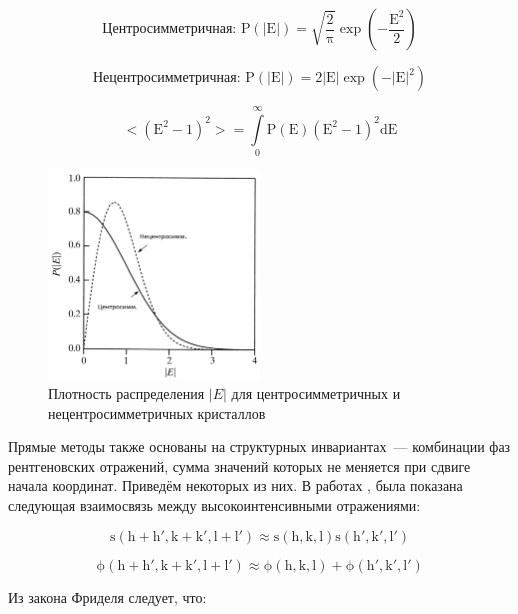 \begin{equation}\label{pe1}
	\mathrm{\text{Центросимметричная: }P(|E|)=\sqrt{\frac{2}{\pi}}\exp(-\frac{E^2}{2})}
\end{equation}

\begin{equation}\label{pe2}
	\mathrm{\text{Нецентросимметричная: }P(|E|) = 2|E|\exp(-|E|^2)}
\end{equation}

\begin{equation}\label{mean}
	\mathrm{<(E^2-1)^2> = \int\limits_0^\infty P(E)(E^2-1)^2dE}
\end{equation}

\begin{figure}[H]
	\centering
	\includegraphics[width=0.5\textwidth]{figures/eimage.png}\hfill
	\caption{Плотность распределения $|E|$ для центросимметричных и нецентросимметричных кристаллов \cite{giacovazzo_international_2010}}
	\label{eimage}
\end{figure}

Прямые методы также основаны на структурных инвариантах~--- комбинации фаз рентгеновских отражений, сумма значений которых не меняется при сдвиге начала координат. Приведём некоторых из них. В работах \cite{sayre_squaring_1952}, \cite{cochran_relation_1952} была показана следующая взаимосвязь между высокоинтенсивными отражениями:

\begin{equation}\label{eq4}
\mathrm{ 
s(h+h', k+k', l+l') \approx s(h,k,l) s(h', k', l')}
\end{equation}


\begin{equation}\label{eq41}
\mathrm{
\phi(h+h', k+k', l+l')\approx \phi(h,k,l)+\phi(h',k',l')
}
\end{equation}

Из закона Фриделя следует, что:

